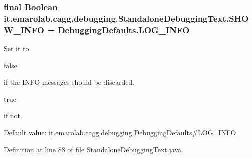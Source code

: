 \hypertarget{classit_1_1emarolab_1_1cagg_1_1debugging_1_1StandaloneDebuggingText_a3d21db1e937e43fb3089bba1184387b4}{
\subsubsection[{S\-H\-O\-W\-\_\-\-I\-N\-F\-O}]{\setlength{\rightskip}{0pt plus 5cm}final Boolean it.\-emarolab.\-cagg.\-debugging.\-Standalone\-Debugging\-Text.\-S\-H\-O\-W\-\_\-\-I\-N\-F\-O = {\bf Debugging\-Defaults.\-L\-O\-G\-\_\-\-I\-N\-F\-O}\hspace{0.3cm}{\ttfamily [static]}}}\label{classit_1_1emarolab_1_1cagg_1_1debugging_1_1StandaloneDebuggingText_a3d21db1e937e43fb3089bba1184387b4}
Set it to
\begin{DoxyCode}
\textcolor{keyword}{false} 
\end{DoxyCode}
 if the I\-N\-F\-O messages should be discarded.
\begin{DoxyCode}
\textcolor{keyword}{true} 
\end{DoxyCode}
 if not. \par
 Default value\-: \hyperlink{classit_1_1emarolab_1_1cagg_1_1debugging_1_1DebuggingDefaults_a029fcf850c3dd1c1aed7c8bc0620ed8a}{it.\-emarolab.\-cagg.\-debugging.\-Debugging\-Defaults\#\-L\-O\-G\-\_\-\-I\-N\-F\-O} 

Definition at line 88 of file Standalone\-Debugging\-Text.\-java.

